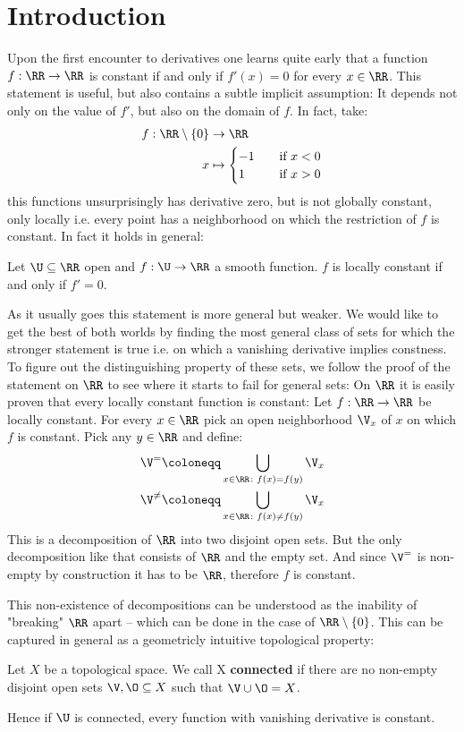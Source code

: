 \chapter*{Introduction}
Upon the first encounter to derivatives one learns quite early that a function
$f: \RR \to \RR$ is constant if and only if $f'(x) = 0$ for every $x \in \RR$. This statement is useful,
but also contains a subtle implicit assumption: It depends not only on the value of $f'$, but also on
the domain of $f$. In fact, take:
\begin{align*}
	f: \RR \setminus \{0\} &\to \RR \\
		x &\mapsto \begin{cases}
			-1 \quad&\text{if } x < 0 \\
			 1 \quad&\text{if } x > 0
		\end{cases}
\end{align*}
this functions unsurprisingly has derivative zero, but is not globally constant, only locally i.e. every
point has a neighborhood on which the restriction of $f$ is constant. In fact it holds in general:
\begin{lemma}
	Let $\U \subseteq \RR$ open and $f: \U \to \RR$ a smooth function. $f$ is locally constant if and only if
	$f' = 0$.
\end{lemma}
As it usually goes this statement is more general but weaker. We would like to get the best
of both worlds by finding the most general class of sets for which the stronger statement is
true i.e. on which a vanishing derivative implies constness. To figure out the distinguishing
property of these sets, we follow the proof of the statement on $\RR$ to see where it starts
to fail for general sets: On $\RR$ it is easily proven that every locally constant function
is constant: Let $f: \RR \to \RR$ be locally constant. For every $x \in \RR$ pick an open
neighborhood $\V_x$ of $x$ on which $f$ is constant. Pick any $y \in \RR$ and define:
\begin{align*}
	\V^=      &\coloneqq \bigcup_{x \in \RR\colon f(x) = f(y)} \V_x \\
	\V^{\neq} &\coloneqq \bigcup_{x \in \RR\colon f(x) \neq f(y)} \V_x
\end{align*}
This is a decomposition of $\RR$ into two disjoint open sets. But the only decomposition like
that consists of $\RR$ and the empty set. And since $\V^=$ is non-empty by construction it has
to be $\RR$, therefore $f$ is constant.

This non-existence of decompositions can be understood as the inability of "breaking" $\RR$ apart – which can
be done in the case of $\RR \setminus \{0\}$. This can be captured in general as a geometricly intuitive
topological property:
\begin{definition}
	Let $X$ be a topological space. We call X \textbf{connected} if there are no non-empty
	disjoint open sets $\V, \O \subseteq X$ such that $\V \cup \O = X$.
\end{definition}
Hence if $\U$ is connected, every function with vanishing derivative is constant.

